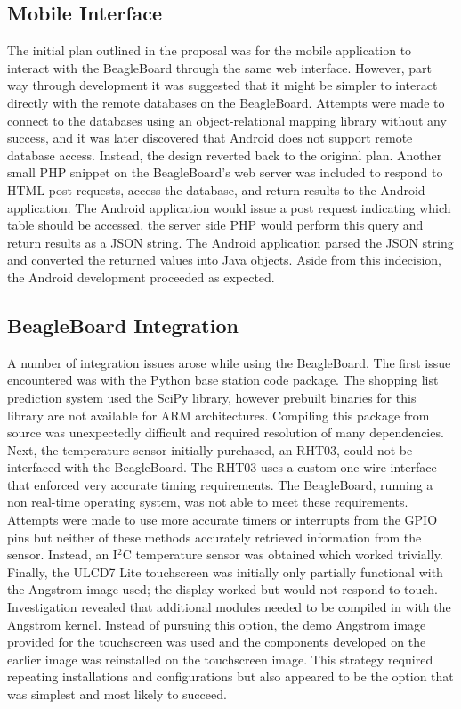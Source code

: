 \documentclass[11pt]{article} %
\begin{document}
\subsection{Mobile Interface}
The initial plan outlined in the proposal was for the mobile application to interact with the BeagleBoard through the same web interface. However, part way through development it was suggested that it might be simpler to interact directly with the remote databases on the BeagleBoard. Attempts were made to connect to the databases using an object-relational mapping library without any success, and it was later discovered that Android does not support remote database access. Instead, the design reverted back to the original plan. Another small PHP snippet on the BeagleBoard's web server was included to respond to HTML post requests, access the database, and return results to the Android application. The Android application would issue a post request indicating which table should be accessed, the server side PHP would perform this query and return results as a JSON string. The Android application parsed the JSON string and converted the returned values into Java objects. Aside from this indecision, the Android development proceeded as expected.

\subsection{BeagleBoard Integration}
A number of integration issues arose while using the BeagleBoard. The first issue encountered was with the Python base station code package. The shopping list prediction system used the SciPy library, however prebuilt binaries for this library are not available for ARM architectures. Compiling this package from source was unexpectedly difficult and required resolution of many dependencies. Next, the temperature sensor initially purchased, an RHT03, could not be interfaced with the BeagleBoard. The RHT03 uses a custom one wire interface that enforced very accurate timing requirements. The BeagleBoard, running a non real-time operating system, was not able to meet these requirements. Attempts were made to use more accurate timers or interrupts from the GPIO pins but neither of these methods accurately retrieved information from the sensor. Instead, an I$^2$C temperature sensor was obtained which worked trivially. Finally, the ULCD7 Lite touchscreen was initially only partially functional with the Angstrom image used; the display worked but would not respond to touch. Investigation revealed that additional modules needed to be compiled in with the Angstrom kernel. Instead of pursuing this option, the demo Angstrom image provided for the touchscreen was used and the components developed on the earlier image was reinstalled on the touchscreen image. This strategy required repeating installations and configurations but also appeared to be the option that was simplest and most likely to succeed.
\end{document}
